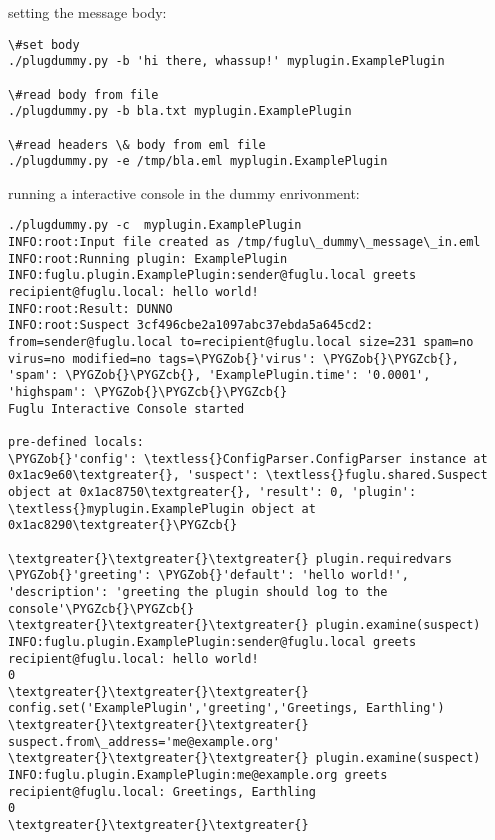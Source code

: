 \documentclass[letterpaper,10pt,english]{sphinxmanual}
\def\PYGZob{\char`\{}
\def\PYGZcb{\char`\}}
\begin{document}
setting the message body:

\begin{Verbatim}[commandchars=\\\{\}]
\#set body
./plugdummy.py -b 'hi there, whassup!' myplugin.ExamplePlugin

\#read body from file
./plugdummy.py -b bla.txt myplugin.ExamplePlugin

\#read headers \& body from eml file
./plugdummy.py -e /tmp/bla.eml myplugin.ExamplePlugin
\end{Verbatim}

running a interactive console in the dummy enrivonment:

\begin{Verbatim}[commandchars=\\\{\}]
./plugdummy.py -c  myplugin.ExamplePlugin
INFO:root:Input file created as /tmp/fuglu\_dummy\_message\_in.eml
INFO:root:Running plugin: ExamplePlugin
INFO:fuglu.plugin.ExamplePlugin:sender@fuglu.local greets recipient@fuglu.local: hello world!
INFO:root:Result: DUNNO
INFO:root:Suspect 3cf496cbe2a1097abc37ebda5a645cd2: from=sender@fuglu.local to=recipient@fuglu.local size=231 spam=no virus=no modified=no tags=\PYGZob{}'virus': \PYGZob{}\PYGZcb{}, 'spam': \PYGZob{}\PYGZcb{}, 'ExamplePlugin.time': '0.0001', 'highspam': \PYGZob{}\PYGZcb{}\PYGZcb{}
Fuglu Interactive Console started

pre-defined locals:
\PYGZob{}'config': \textless{}ConfigParser.ConfigParser instance at 0x1ac9e60\textgreater{}, 'suspect': \textless{}fuglu.shared.Suspect object at 0x1ac8750\textgreater{}, 'result': 0, 'plugin': \textless{}myplugin.ExamplePlugin object at 0x1ac8290\textgreater{}\PYGZcb{}

\textgreater{}\textgreater{}\textgreater{} plugin.requiredvars
\PYGZob{}'greeting': \PYGZob{}'default': 'hello world!', 'description': 'greeting the plugin should log to the console'\PYGZcb{}\PYGZcb{}
\textgreater{}\textgreater{}\textgreater{} plugin.examine(suspect)
INFO:fuglu.plugin.ExamplePlugin:sender@fuglu.local greets recipient@fuglu.local: hello world!
0
\textgreater{}\textgreater{}\textgreater{} config.set('ExamplePlugin','greeting','Greetings, Earthling')
\textgreater{}\textgreater{}\textgreater{} suspect.from\_address='me@example.org'
\textgreater{}\textgreater{}\textgreater{} plugin.examine(suspect)
INFO:fuglu.plugin.ExamplePlugin:me@example.org greets recipient@fuglu.local: Greetings, Earthling
0
\textgreater{}\textgreater{}\textgreater{}
\end{Verbatim}
\end{document}
